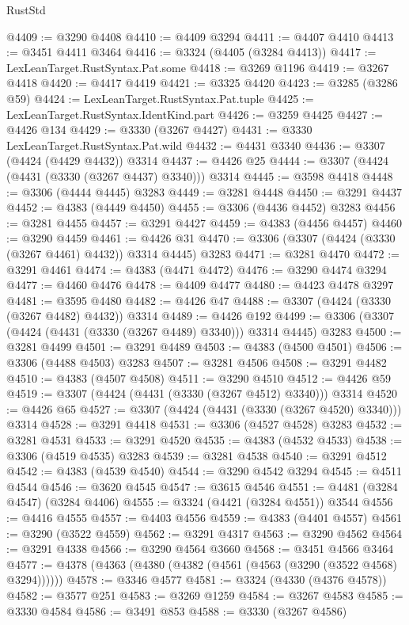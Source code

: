 \begin{lexlean}{RustStd}
\begin{coremodule}
@4409 := @3290 @4408
@4410 := @4409 @3294
@4411 := @4407 @4410
@4413 := @3451 @4411 @3464
@4416 := @3324 (@4405 (@3284 @4413))
@4417 := LexLeanTarget.RustSyntax.Pat.some
@4418 := @3269 @1196
@4419 := @3267 @4418
@4420 := @4417 @4419
@4421 := @3325 @4420
@4423 := @3285 (@3286 @59)
@4424 := LexLeanTarget.RustSyntax.Pat.tuple
@4425 := LexLeanTarget.RustSyntax.IdentKind.part
@4426 := @3259 @4425
@4427 := @4426 @134
@4429 := @3330 (@3267 @4427)
@4431 := @3330 LexLeanTarget.RustSyntax.Pat.wild
@4432 := @4431 @3340
@4436 := @3307 (@4424 (@4429 @4432)) @3314
@4437 := @4426 @25
@4444 := @3307 (@4424 (@4431 (@3330 (@3267 @4437) @3340))) @3314
@4445 := @3598 @4418
@4448 := @3306 (@4444 @4445) @3283
@4449 := @3281 @4448
@4450 := @3291 @4437
@4452 := @4383 (@4449 @4450)
@4455 := @3306 (@4436 @4452) @3283
@4456 := @3281 @4455
@4457 := @3291 @4427
@4459 := @4383 (@4456 @4457)
@4460 := @3290 @4459
@4461 := @4426 @31
@4470 := @3306 (@3307 (@4424 (@3330 (@3267 @4461) @4432)) @3314 @4445) @3283
@4471 := @3281 @4470
@4472 := @3291 @4461
@4474 := @4383 (@4471 @4472)
@4476 := @3290 @4474 @3294
@4477 := @4460 @4476
@4478 := @4409 @4477
@4480 := @4423 @4478 @3297
@4481 := @3595 @4480
@4482 := @4426 @47
@4488 := @3307 (@4424 (@3330 (@3267 @4482) @4432)) @3314
@4489 := @4426 @192
@4499 := @3306 (@3307 (@4424 (@4431 (@3330 (@3267 @4489) @3340))) @3314 @4445) @3283
@4500 := @3281 @4499
@4501 := @3291 @4489
@4503 := @4383 (@4500 @4501)
@4506 := @3306 (@4488 @4503) @3283
@4507 := @3281 @4506
@4508 := @3291 @4482
@4510 := @4383 (@4507 @4508)
@4511 := @3290 @4510
@4512 := @4426 @59
@4519 := @3307 (@4424 (@4431 (@3330 (@3267 @4512) @3340))) @3314
@4520 := @4426 @65
@4527 := @3307 (@4424 (@4431 (@3330 (@3267 @4520) @3340))) @3314
@4528 := @3291 @4418
@4531 := @3306 (@4527 @4528) @3283
@4532 := @3281 @4531
@4533 := @3291 @4520
@4535 := @4383 (@4532 @4533)
@4538 := @3306 (@4519 @4535) @3283
@4539 := @3281 @4538
@4540 := @3291 @4512
@4542 := @4383 (@4539 @4540)
@4544 := @3290 @4542 @3294
@4545 := @4511 @4544
@4546 := @3620 @4545
@4547 := @3615 @4546
@4551 := @4481 (@3284 @4547) (@3284 @4406)
@4555 := @3324 (@4421 (@3284 @4551)) @3544
@4556 := @4416 @4555
@4557 := @4403 @4556
@4559 := @4383 (@4401 @4557)
@4561 := @3290 (@3522 @4559)
@4562 := @3291 @4317
@4563 := @3290 @4562
@4564 := @3291 @4338
@4566 := @3290 @4564 @3660
@4568 := @3451 @4566 @3464
@4577 := @4378 (@4363 (@4380 (@4382 (@4561 (@4563 (@3290 (@3522 @4568) @3294))))))
@4578 := @3346 @4577
@4581 := @3324 (@4330 (@4376 @4578))
@4582 := @3577 @251
@4583 := @3269 @1259
@4584 := @3267 @4583
@4585 := @3330 @4584
@4586 := @3491 @853
@4588 := @3330 (@3267 @4586)

\end{coremodule}
\end{lexlean}
